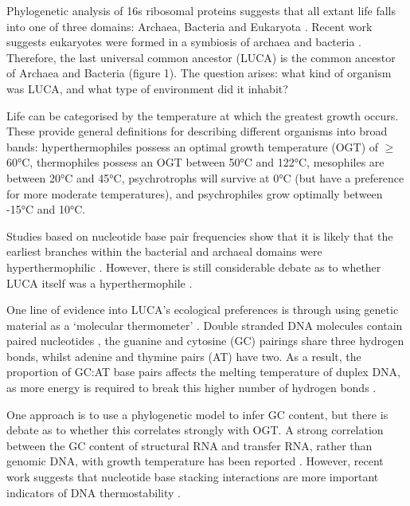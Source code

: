 Phylogenetic analysis of 16s ribosomal proteins suggests that all extant life falls into one of three domains: Archaea, Bacteria and Eukaryota \cite{woese1990towards,fox1977classification,garrett2014backward}. Recent work suggests eukaryotes were formed in a symbiosis of archaea and bacteria \cite{koonin2014dispersed}. Therefore, the last universal common ancestor (\gls{LUCA}) is the common ancestor of Archaea and Bacteria (figure 1). The question arises: what kind of organism was LUCA, and what type of environment did it inhabit?

Life can be categorised by the temperature at which the greatest growth occurs. These provide general definitions for describing different organisms into broad bands: hyperthermophiles possess an optimal growth temperature (\gls{OGT}) of $\geq$60°C, thermophiles possess an OGT between 50°C and 122°C, mesophiles are between 20°C and 45°C, psychrotrophs will survive at 0°C (but have a preference for more moderate temperatures), and psychrophiles grow optimally between -15°C and 10°C.

Studies based on nucleotide base pair frequencies show that it is likely that the earliest branches within the bacterial and archaeal domains were hyperthermophilic \cite{stetter2006hyperthermophiles}. However, there is still considerable debate as to whether LUCA itself was a hyperthermophile \cite{weiss2016,gogarten2016luca,boussau2008parallel,di2003universal}.

One line of evidence into LUCA's ecological preferences is through using genetic material as a `molecular thermometer' \cite{groussin2013molecular}. Double stranded DNA molecules contain paired nucleotides \cite{watson1953molecular}, the guanine and cytosine (GC) pairings share three hydrogen bonds, whilst adenine and thymine pairs (AT) have two. As a result, the proportion of GC:AT base pairs affects the melting temperature of duplex DNA, as more energy is required to break this higher number of hydrogen bonds \cite{vinogradov1971hydrogen}.

One approach is to use a phylogenetic model to infer GC content, but there is debate as to whether this correlates strongly with OGT. A strong correlation between the GC content of structural RNA and transfer RNA, rather than genomic DNA, with growth temperature has been reported \cite{hurst2001high,galtier1997relationships}. However, recent work suggests that nucleotide base stacking interactions are more important indicators of DNA thermostability \cite{yakovchuk2006base}.

